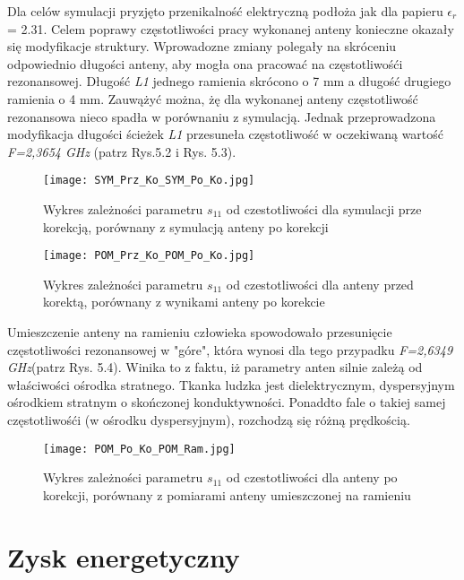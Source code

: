 \newpage
Dla celów symulacji pryzjęto przenikalność elektryczną podłoża jak dla papieru $\epsilon_{r}$ = 2.31. Celem poprawy częstotliwości pracy wykonanej anteny konieczne okazały się modyfikacje struktury. Wprowadozne zmiany polegały na skróceniu odpowiednio długości anteny, aby mogła ona pracować na częstotliwośći rezonansowej. Długość \emph{L1} jednego ramienia skrócono o 7 mm a długość drugiego ramienia o 4 mm. Zauwążyć można, żę dla wykonanej anteny częstotliwość rezonansowa nieco spadła w porównaniu z symulacją. Jednak przeprowadzona modyfikacja długości ścieżek \emph{L1} przesuneła częstotliwość w oczekiwaną wartość \emph{F=2,3654 GHz} (patrz Rys.5.2 i Rys. 5.3).  

\begin{figure}[h!]
\centering
	\texttt{[image: SYM\_Prz\_Ko\_SYM\_Po\_Ko.jpg]}
	\caption{Wykres zależności parametru $s_{11}$ od czestotliwości dla symulacji prze korekcją, porównany z symulacją anteny po korekcji}
\end{figure}


\begin{figure}[h!]
\centering
	\texttt{[image: POM\_Prz\_Ko\_POM\_Po\_Ko.jpg]}
	\caption{Wykres zależności parametru $s_{11}$ od czestotliwości dla anteny przed korektą, porównany z wynikami anteny po korekcie}
\end{figure}


\newpage
\noindent
\newline Umieszczenie anteny na ramieniu człowieka spowodowało przesunięcie częstotliwości rezonansowej w "góre", która wynosi dla tego przypadku \emph{F=2,6349 GHz}(patrz Rys. 5.4). Winika to z faktu, iż parametry anten silnie zależą od właściwości ośrodka stratnego.  
Tkanka ludzka jest dielektrycznym, dyspersyjnym ośrodkiem stratnym o skończonej konduktywności. Ponaddto fale o takiej samej częstotliwośći (w ośrodku dyspersyjnym), rozchodzą się różną prędkością. 

\begin{figure}[h!]
\centering
	\texttt{[image: POM\_Po\_Ko\_POM\_Ram.jpg]}
	\caption{Wykres zależności parametru $s_{11}$ od czestotliwości dla anteny po korekcji, porównany z pomiarami anteny umieszczonej na ramieniu}
\end{figure}


\newpage
\section{Zysk energetyczny}

